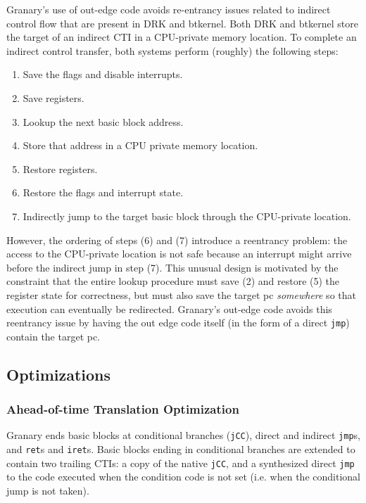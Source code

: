 \documentclass[preprint]{sigplanconf}
\begin{document}
Granary's use of out-edge code avoids re-entrancy issues related to indirect control flow that are present in DRK and btkernel. Both DRK and btkernel store the target of an indirect CTI in a CPU-private memory location. To complete an indirect control transfer, both systems perform (roughly) the following steps: \begin{enumerate}[itemindent=\parindent]%
\setlength{\itemsep}{2pt}%
\setlength{\parskip}{0pt}%
	\item Save the flags and disable interrupts.
	\item Save registers.
	\item Lookup the next basic block address.
	\item Store that address in a CPU private memory location.
	\item Restore registers.
	\item Restore the flags and interrupt state.
	\item Indirectly jump to the target basic block through the CPU-private location.
\end{enumerate} %
However, the ordering of steps (6) and (7) introduce a reentrancy problem: the access to the CPU-private location is not safe because an interrupt might arrive before the indirect jump in step (7). This unusual design is motivated by the constraint that the entire lookup procedure must save (2) and restore (5) the register state for correctness, but must also save the target pc \emph{somewhere} so that execution can eventually be redirected. Granary's out-edge code avoids this reentrancy issue by having the out edge code itself (in the form of a direct \texttt{jmp}) contain the target pc.

\subsection{Optimizations}

\subsubsection{Ahead-of-time Translation Optimization} \label{sec:aot}
Granary ends basic blocks at conditional branches (\texttt{jCC}), direct and indirect \texttt{jmp}s, and \texttt{ret}s and \texttt{iret}s. Basic blocks ending in conditional branches are extended to contain two trailing CTIs: a copy of the native \texttt{jCC}, and a synthesized direct \texttt{jmp} to the code executed when the condition code is not set (i.e. when the conditional jump is not taken).
\end{document}
